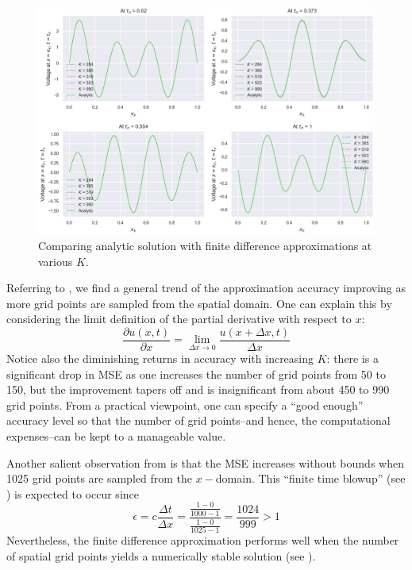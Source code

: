\documentclass{article}
\begin{document}
\begin{figure}[t!]
   \centering
   \includegraphics[scale=0.7]{on spatial domain discretization - analytic vs numerical.png}
   \caption{Comparing analytic solution with finite difference approximations at various $K$.}
	\label{fig: On Spatial Domain Discretization results: Analytic vs numerical solutions}
\end{figure}

Referring to ,
we find a general trend of the approximation accuracy improving
as more grid points are sampled from the spatial domain.
One can explain this by considering the limit definition of the partial derivative with respect to $x$:
\begin{equation}
   \label{eqn: Limit definition of the partial derivative wrt to x}
   \frac{\partial u \left(x,t\right)}{\partial x}
   =
   \lim_{\Delta x \longrightarrow 0}
   \frac{u \left(x + \Delta x, t\right)}{\Delta x}
\end{equation}
Notice also the diminishing returns in accuracy with increasing $K$:
there is a significant drop in MSE as one increases the number of grid points from 50 to 150,
but the improvement tapers off and is insignificant from about 450 to 990 grid points.
From a practical viewpoint, one can specify a ``good enough'' accuracy level so that the number of grid points--and hence,
the computational expenses--can be kept to a manageable value.

Another salient observation from 
is that the MSE increases without bounds when 1025 grid points are sampled from the $x-$domain.
This ``finite time blowup'' (see )
is expected to occur since
\begin{equation*}
   \epsilon = c \frac{\Delta t}{\Delta x} = \frac{\frac{1 - 0}{1000 - 1}}{\frac{1 - 0}{1025 - 1}} = \frac{1024}{999} > 1
\end{equation*}
Nevertheless, the finite difference approximation performs well when the number of spatial grid points yields a numerically stable solution
(see ).
\end{document}
